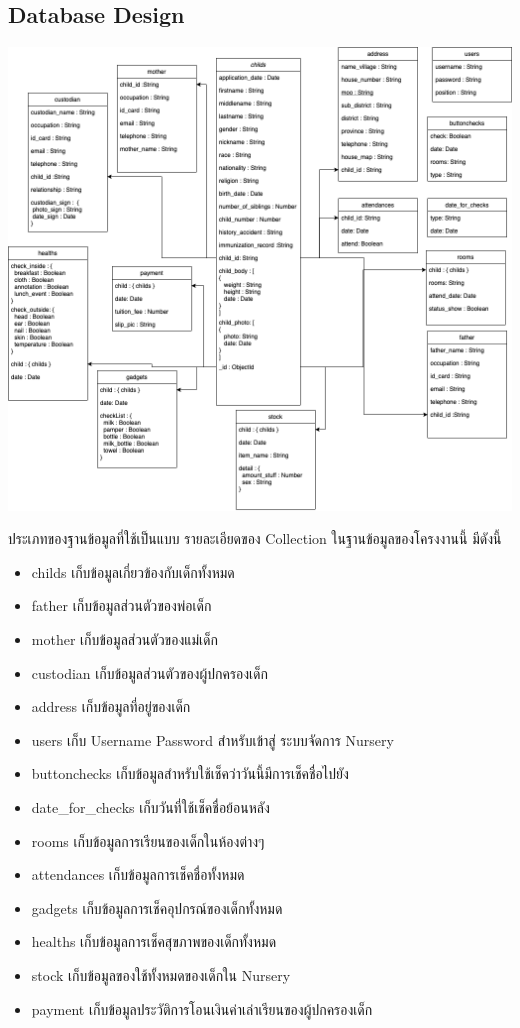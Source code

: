 \subsection{Database Design}
  \begin{center}
    \includegraphics[width=\linewidth]{images/databaseDiagram.png}
  \end{center}
    
  ประเภทของฐานข้อมูลที่ใช้เป็นแบบ  รายละเอียดของ Collection ในฐานข้อมูลของโครงงานนี้ มีดังนี้
  \begin{itemize}
    \item childs เก็บข้อมูลเกี่ยวข้องกับเด็กทั้งหมด 
    \item father เก็บข้อมูลส่วนตัวของพ่อเด็ก
    \item mother เก็บข้อมูลส่วนตัวของแม่เด็ก
    \item custodian เก็บข้อมูลส่วนตัวของผู้ปกครองเด็ก
    \item address เก็บข้อมูลที่อยู่ของเด็ก
    \item users เก็บ Username Password สำหรับเข้าสู่ ระบบจัดการ Nursery 
    \item buttonchecks เก็บข้อมูลสำหรับใช้เช็คว่าวันนี้มีการเช็คชื่อไปยัง
    \item date\_for\_checks เก็บวันที่ใช้เช็คชื่อย้อนหลัง
    \item rooms เก็บข้อมูลการเรียนของเด็กในห้องต่างๆ
    \item attendances เก็บข้อมูลการเช็คชื่อทั้งหมด
    \item gadgets เก็บข้อมูลการเช็คอุปกรณ์ของเด็กทั้งหมด
    \item healths เก็บข้อมูลการเช็คสุขภาพของเด็กทั้งหมด
    \item stock เก็บข้อมูลของใช้ทั้งหมดของเด็กใน Nursery 
    \item payment เก็บข้อมูลประวัติการโอนเงินค่าเล่าเรียนของผู้ปกครองเด็ก

  \end{itemize}

